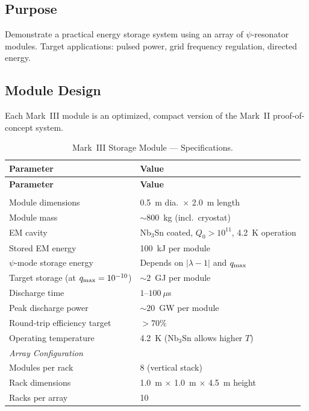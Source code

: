 \documentclass[11pt,a4paper]{article}
\begin{document}
\subsection{Purpose}

Demonstrate a practical energy storage system using an array of
$\psi$-resonator modules.  Target applications: pulsed power,
grid frequency regulation, directed energy.

\subsection{Module Design}

Each Mark~III module is an optimized, compact version of the Mark~II
proof-of-concept system.

\begin{longtable}{@{}p{6cm}p{8cm}@{}}
\caption{Mark~III Storage Module --- Specifications.}
\label{tab:mk3} \\
\toprule
\textbf{Parameter} & \textbf{Value} \\
\midrule
\endfirsthead
\toprule
\textbf{Parameter} & \textbf{Value} \\
\midrule
\endhead
\bottomrule
\endfoot
\multicolumn{2}{l}{\textit{Individual Module}} \\
\midrule
Module dimensions & 0.5~m dia.\ $\times$ 2.0~m length \\
Module mass & $\sim 800$~kg (incl.\ cryostat) \\
EM cavity & Nb$_3$Sn coated, $Q_0 > 10^{11}$, 4.2~K operation \\
Stored EM energy & 100~kJ per module \\
$\psi$-mode storage energy & Depends on $|\lambda-1|$ and $q_{\rm max}$ \\
Target storage (at $q_{\rm max} = 10^{-10}$) & $\sim 2$~GJ per module \\
Discharge time & $1$--$100~\mu$s \\
Peak discharge power & $\sim 20$~GW per module \\
Round-trip efficiency target & $> 70\%$ \\
Operating temperature & 4.2~K (Nb$_3$Sn allows higher $T$) \\
\midrule
\multicolumn{2}{l}{\textit{Array Configuration}} \\
\midrule
Modules per rack & 8 (vertical stack) \\
Rack dimensions & 1.0~m $\times$ 1.0~m $\times$ 4.5~m height \\
Racks per array & 10 \\

\end{longtable}
\end{document}
